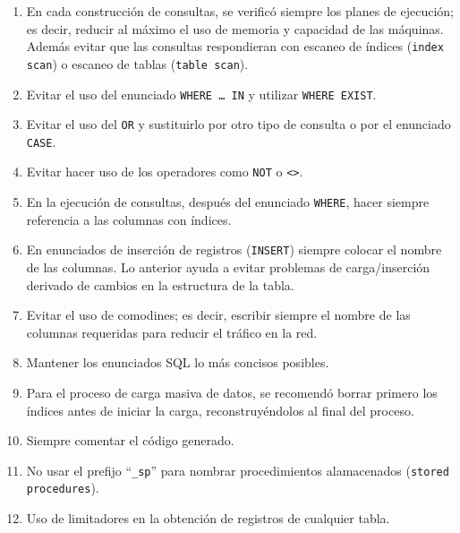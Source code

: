 \begin{enumerate}

\item En cada construcción de consultas, se verificó siempre los planes de
  ejecución; es decir, reducir al máximo el uso de memoria y capacidad de las
  máquinas. Además evitar que las consultas respondieran con escaneo de índices
  (\texttt{index scan}) o escaneo de tablas (\texttt{table scan}).

\item Evitar el uso del enunciado \texttt{WHERE \ldots{} IN} y utilizar
  \texttt{WHERE EXIST}.

\item Evitar el uso del \texttt{OR} y sustituirlo por otro tipo de consulta o
  por el enunciado \texttt{CASE}.

\item Evitar hacer uso de los operadores como \texttt{NOT} o
  \texttt{\textless\textgreater}.

\item En la ejecución de consultas, después del enunciado \texttt{WHERE}, hacer
  siempre referencia a las columnas con índices.

\item En enunciados de inserción de registros (\texttt{INSERT}) siempre colocar
  el nombre de las columnas. Lo anterior ayuda a evitar problemas de
  carga/inserción derivado de cambios en la estructura de la tabla.

\item Evitar el uso de comodines; es decir, escribir siempre el nombre de las
  columnas requeridas para reducir el tráfico en la red.

\item Mantener los enunciados SQL lo más concisos posibles.

\item Para el proceso de carga masiva de datos, se recomendó borrar primero los
  índices antes de iniciar la carga, reconstruyéndolos al final del proceso.

\item Siempre comentar el código generado.

\item No usar el prefijo ``\texttt{\_sp}'' para nombrar procedimientos
  alamacenados (\texttt{stored procedures}).

\item Uso de limitadores en la obtención de registros de cualquier tabla.


\end{enumerate}
